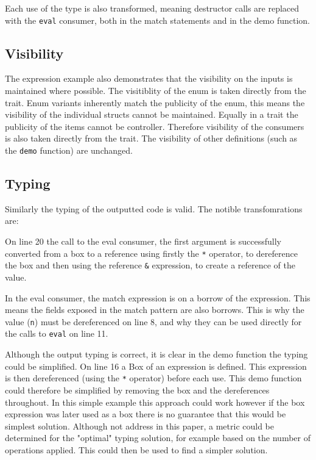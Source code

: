 \documentclass[ oneside,%
                    author={James Elgar},
                    degree={MEng},
                     title={Bidirectional transformer between functional and \\ object-oriented programming in Rust},
                  subtitle={}]{dissertation}
\newcommand{\rust}[1]{\texttt{#1}}
\begin{document}
Each use of the type is also transformed, meaning destructor calls are replaced with the \rust{eval} consumer, both in the match statements and in the demo function.


\subsection{Visibility}

The expression example also demonstrates that the visibility on the inputs is maintained where possible. The visitiblity of the enum is taken directly from the trait. Enum variants inherently match the publicity of the enum, this means the visibility of the individual structs cannot be maintained. Equally in a trait the publicity of the items cannot be controller. Therefore visibility of the consumers is also taken directly from the trait. The visibility of other definitions (such as the \rust{demo} function) are unchanged.

\subsection{Typing}

Similarly the typing of the outputted code is valid. The notible transfomrations are:

On line 20 the call to the eval consumer, the first argument is successfully converted from a box to a reference using firstly the \rust{*} operator, to dereference the box and then using the reference \rust{&} expression, to create a reference of the value.

In the eval consumer, the match expression is on a borrow of the expression. This means the fields exposed in the match pattern are also borrows. This is why the value (\rust{n}) must be dereferenced on line 8, and why they can be used directly for the calls to \rust{eval} on line 11.

Although the output typing is correct, it is clear in the demo function the typing could be simplified. On line 16 a Box of an expression is defined. This expression is then dereferenced (using the \rust{*} operator) before each use. This demo function could therefore be simplified by removing the box and the dereferences throughout. In this simple example this approach could work however if the box expression was later used as a box there is no guarantee that this would be simplest solution. Although not address in this paper, a metric could be determined for the "optimal" typing solution, for example based on the number of operations applied. This could then be used to find a simpler solution.
\end{document}
